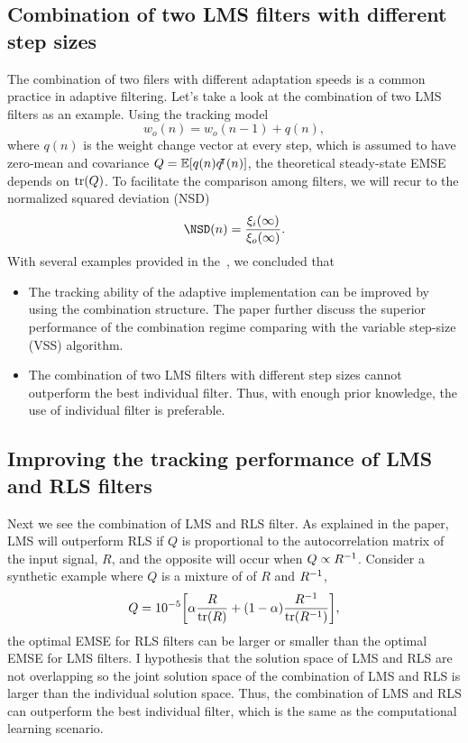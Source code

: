 \documentclass{article}
\begin{document}
\subsection{Combination of two LMS filters with different step sizes}
The combination of two filers with different adaptation speeds is a common practice in adaptive filtering. Let's take a look at the combination of two LMS filters as an example. 
Using the tracking model
\begin{equation}
    w_o(n)=w_o(n-1)+q(n),
\end{equation}
where $q(n)$ is the weight change vector at every step, which is assumed to have zero-mean and covariance $Q=\E{q(n)q\trn(n)}$, the theoretical steady-state EMSE depends on $\operatorname{\mathrm{tr}}(Q)$. To facilitate the comparison among filters, we will recur to the normalized squared deviation (NSD)
\begin{equation}
    \NSD(n)=\frac{\xi_i(\infty)}{\xi_o(\infty)}.
\end{equation}
With several examples provided in the~\cite{Arenas_Garcia_2016}, we concluded that
\begin{itemize}
    \item The tracking ability of the adaptive implementation can be improved by using the combination structure. The paper further discuss the superior performance of the combination regime comparing with the variable step-size (VSS) algorithm.
    \item The combination of two LMS filters with different step sizes cannot outperform the best individual filter. Thus, with enough prior knowledge, the use of individual filter is preferable.
\end{itemize}

\subsection{Improving the tracking performance of LMS and RLS filters}
Next we see the combination of LMS and RLS filter. As explained in the paper, LMS will outperform RLS if $Q$ is proportional to the autocorrelation matrix of the input signal, $R$, and the opposite will occur when $Q \propto R^{-1}$. Consider a synthetic example where $Q$ is a mixture of of $R$ and $R^{-1}$,
\begin{equation}
    Q=10^{-5}\bracks*{\alpha\frac{R}{\tr(R)}+(1-\alpha)\frac{R\inv}{\tr(R\inv)}},
\end{equation}
the optimal EMSE for RLS filters can be larger or smaller than the optimal EMSE for LMS filters. I hypothesis that the solution space of LMS and RLS are not overlapping so the joint solution space of the combination of LMS and RLS is larger than the individual solution space. Thus, the combination of LMS and RLS can outperform the best individual filter, which is the same as the computational learning scenario.
\end{document}
